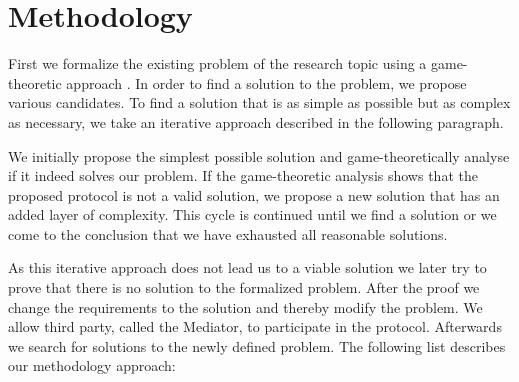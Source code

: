 \documentclass{cacthesis}
\newcommand{\authnote}[3]{{ \footnotesize \textbf{#1[#2: #3]~}}}
\newcommand{\niknote}[1]{\authnote{\color{red}}{Nikos}{#1}}
\begin{document}
	\section{Methodology}
	\label{sec:methodology}
	First we formalize the existing problem of the research topic using a game-theoretic approach \cite{leyton-brown_essentials_2008}. In order to find a solution to the problem, we propose various candidates.  To find a solution that is as simple as possible but as complex as necessary, we take an iterative approach described in the following paragraph.\newline
	
	We initially propose the simplest possible solution and game-theoretically analyse if it indeed solves our problem. 
	If the game-theoretic analysis shows that the proposed protocol is not a valid solution, we propose a new solution that has an added layer of complexity. This cycle is continued until we find a solution or  we come to the conclusion that we have exhausted all reasonable solutions. \newline
	
	As this iterative approach does not lead us to a viable solution we later try to prove that there is no solution to the formalized problem. After the proof we change the requirements to the solution
	and thereby modify the problem. We allow third party, called the Mediator, to participate in the protocol.  Afterwards we search for solutions to the newly defined problem. The following list describes our methodology approach:
\end{document}
